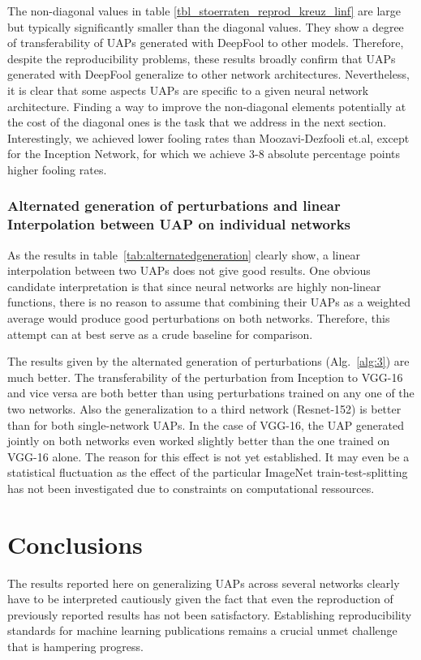 \documentclass[runningheads]{llncs}
\begin{document}
The non-diagonal values in table \ref{tbl_stoerraten_reprod_kreuz_linf} are large but typically significantly smaller than the diagonal values. They show a degree of transferability of UAPs generated with DeepFool to other models. Therefore, despite the reproducibility problems, these results broadly confirm that UAPs generated with DeepFool generalize to other network architectures. Nevertheless, it is clear that some aspects UAPs are specific to a given neural network architecture. Finding a way to improve the non-diagonal elements potentially at the cost of the diagonal ones is the task that we address in the next section.
Interestingly, we achieved lower fooling rates than Moozavi-Dezfooli et.al, except for the Inception Network, for which we achieve 3-8 absolute percentage points higher fooling rates.

\subsubsection{Alternated generation of perturbations and linear Interpolation between UAP on individual networks}
As the results in table~\ref{tab:alternatedgeneration} clearly show, a linear interpolation between two UAPs does not give good results. One obvious candidate interpretation is that since neural networks are highly non-linear functions, there is no reason to assume that combining their UAPs as a weighted average would produce good perturbations on both networks. Therefore, this attempt can at best serve as a crude baseline for comparison. 

The results given by the alternated generation of perturbations (Alg.~\ref{alg:3}) are much better. The transferability of the perturbation from Inception to VGG-16 and vice versa are both better than using perturbations trained on any one of the two networks. Also the generalization to a third network (Resnet-152) is better than for both single-network UAPs. In the case of VGG-16, the UAP generated jointly on both networks even worked slightly better than the one trained on VGG-16 alone. The reason for this effect is not yet established. It may even be a statistical fluctuation as the effect of the particular ImageNet train-test-splitting has not been investigated due to constraints on computational ressources. 

\section{Conclusions}
The results reported here on generalizing UAPs across several networks clearly have to be interpreted cautiously given the fact that even the reproduction of previously reported results has not been satisfactory. Establishing reproducibility standards for machine learning publications remains a crucial unmet challenge that is hampering progress.
\end{document}
